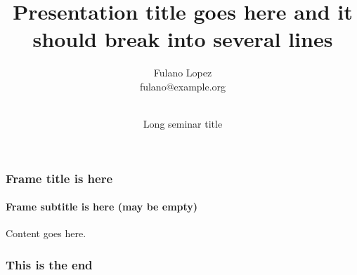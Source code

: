 \documentclass{beamer}
\begin{document}
\title{Presentation title goes here and it should break into several lines}
\author{Fulano Lopez\\
fulano@example.org \\~ 
}
\date[Short seminar title]{Long seminar title}

\begin{frame}
    \maketitle
\end{frame}


\begin{frame}[fragile]
    \frametitle{Frame title is here}
    \framesubtitle{Frame subtitle is here (may be empty)}
    Content goes here.
\end{frame}

\begin{frame}[fragile]
\frametitle{This is the end}
\end{frame}
\end{document}
